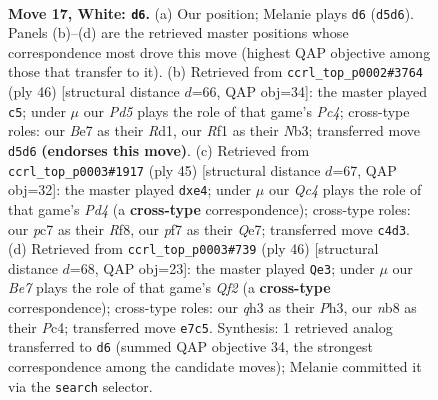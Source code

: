 \documentclass[11pt]{article}
\begin{document}
\clearpage

\begin{figure}[p]\centering
\begin{subfigure}{0.46\textwidth}\centering
\resizebox{\linewidth}{!}{%
\newchessgame
\chessboard[
  setfen={rn2r1k1/p1p1Bp1p/6p1/3P4/2Q1P3/2b4q/P4P1P/R4RK1 w - - 1 17},
  showmover=false,
  pgfstyle=straightmove, color=movearrow, markmove={d5-d6}
]}
\caption{}
\end{subfigure}\hfill
\begin{subfigure}{0.46\textwidth}\centering
\resizebox{\linewidth}{!}{%
\newchessgame
\chessboard[
  setfen={r2r2k1/p4pp1/4pn1p/8/2P5/qN5P/P3QPP1/1R1R2K1 w - - 2 24},
  showmover=false,
  pgfstyle=straightmove, color=movearrow, markmove={c4-c5}
]}
\caption{}
\end{subfigure}
\\[4pt]
\begin{subfigure}{0.46\textwidth}\centering
\resizebox{\linewidth}{!}{%
\newchessgame
\chessboard[
  setfen={2r2rk1/p3q1p1/4p3/1ppp3P/3PN3/3Q4/PP3PP1/R5KR b - - 0 23},
  showmover=false,
  pgfstyle=straightmove, color=movearrow, markmove={d5-e4}
]}
\caption{}
\end{subfigure}\hfill
\begin{subfigure}{0.46\textwidth}\centering
\resizebox{\linewidth}{!}{%
\newchessgame
\chessboard[
  setfen={2r1nrk1/1p5p/p2qp1p1/8/2P5/3B3P/PP3QP1/R4RK1 w - - 0 24},
  showmover=false,
  pgfstyle=straightmove, color=movearrow, markmove={f2-e3}
]}
\caption{}
\end{subfigure}
\caption{\textbf{Move 17, White: \texttt{d6}.} (a) Our position; Melanie plays \texttt{d6} (\texttt{d5d6}). Panels (b)--(d) are the retrieved master positions whose correspondence most drove this move (highest QAP objective among those that transfer to it). (b) Retrieved from \texttt{ccrl\_top\_p0002\#3764} (ply 46) [structural distance $d$=66, QAP obj=34]: the master played \texttt{c5}; under $\mu$ our \emph{Pd5} plays the role of that game's \emph{Pc4}; cross-type roles: our \emph{B}e7 as their \emph{R}d1, our \emph{R}f1 as their \emph{N}b3; transferred move \texttt{d5d6} \textbf{(endorses this move)}. (c) Retrieved from \texttt{ccrl\_top\_p0003\#1917} (ply 45) [structural distance $d$=67, QAP obj=32]: the master played \texttt{dxe4}; under $\mu$ our \emph{Qc4} plays the role of that game's \emph{Pd4} (a \textbf{cross-type} correspondence); cross-type roles: our \emph{p}c7 as their \emph{R}f8, our \emph{p}f7 as their \emph{Q}e7; transferred move \texttt{c4d3}. (d) Retrieved from \texttt{ccrl\_top\_p0003\#739} (ply 46) [structural distance $d$=68, QAP obj=23]: the master played \texttt{Qe3}; under $\mu$ our \emph{Be7} plays the role of that game's \emph{Qf2} (a \textbf{cross-type} correspondence); cross-type roles: our \emph{q}h3 as their \emph{P}h3, our \emph{n}b8 as their \emph{P}c4; transferred move \texttt{e7c5}. Synthesis: 1 retrieved analog transferred to \texttt{d6} (summed QAP objective 34, the strongest correspondence among the candidate moves); Melanie committed it via the \texttt{search} selector.}
\label{fig:thought-m32}
\end{figure}
\end{document}
